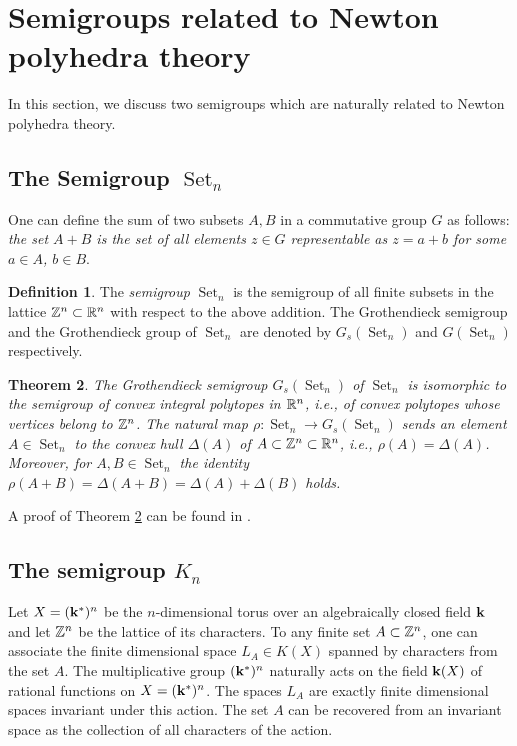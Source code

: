 \documentclass[11pt]{article}
\theoremstyle{plain}
\newtheorem{theorem}{Theorem}[section]
\theoremstyle{definition}
\newtheorem{definition}[theorem]{Definition}
\newcommand\Set{\operatorname{Set}}
\begin{document}
\section{Semigroups  related to Newton polyhedra theory}\label{sect4}

In this section, we discuss two semigroups which are naturally related to Newton polyhedra theory.

\subsection{The Semigroup $\Set_n$}

One can define the sum of two subsets $A,B$ in a commutative group $G$ as follows: {\it the set $A+B$ is the set of all elements $z\in G$ representable as $z=a+b$ for some  $a\in A$, $b\in B$}.

\begin{definition} The {\it semigroup}  $\Set_n$ is the semigroup  of all
finite subsets in the lattice $\Bbb Z^n\subset \Bbb R^n$ with respect to the above
addition. The Grothendieck semigroup  and the Grothendieck group of $\Set_n$ are denoted by $G_s(\Set_n)$ and $G(\Set_n)$ respectively.
\end{definition}

\begin{theorem}\label{theorem4.1} The Grothendieck semigroup  $G_s(\Set_n)$ of $\Set_n$ is isomorphic to the semigroup of convex integral polytopes in $\Bbb R^n$, i.e., of convex polytopes whose  vertices belong to $\Bbb Z^n$.  The natural map $\rho:\Set_n\to G_s(\Set_n)$ sends  an element $A\in \Set_n$  to the convex hull $\Delta (A)$ of $A\subset \Bbb Z^n\subset \Bbb R^n$, i.e., $\rho(A)=\Delta(A)$.  Moreover, for $A,B\in  \Set_n$ the identity $\rho(A+B)=\Delta (A+B)=\Delta(A)+\Delta(B)$ holds.
\end{theorem}
A proof of Theorem \ref{theorem4.1} can be found in  \cite{Kh92}.

\subsection{The semigroup $K_n$}\label{subsec4.2}

Let $X=(\bold k ^*)^n$ be the $n$-dimensional  torus over an algebraically closed field $\bold k$ and let $\Bbb Z^n$ be the lattice of its characters. To any finite set $A\subset \Bbb Z^n$, one can associate the finite dimensional space $L_A\in K(X)$ spanned by characters from the set $A$. The multiplicative group $(\bold k ^*)^n$ naturally acts  on the field $\bold k (X)$ of rational functions on $X=(\bold k^*)^n$. The spaces $L_A$ are exactly finite dimensional spaces  invariant under this action. The set $A$ can be recovered from an invariant space as the collection of all characters of the action.
\end{document}

